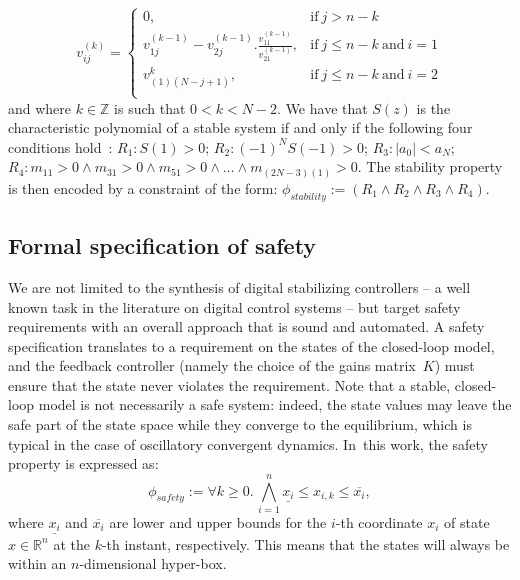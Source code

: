 \documentclass[twocolumn]{autart}    %
\newcommand{\addtodo}[1]{\textcolor{red}{[#1]}}
\begin{document}
%
$$
v_{ij}^{(k)}=\left\{
\begin{array}{ll}
0,&\mbox{if}~j>n-k\\
v_{1j}^{(k-1)}-v_{2j}^{(k-1)} . \frac{v_{11}^{(k-1)}}{v_{21}^{(k-1)}}, & \mbox{if}~j\leq n-k ~\mbox{and}~i=1\\
v_{(1)(N-j+1)}^{k},& \mbox{if}~j\leq n-k ~\mbox{and}~i=2\\
\end{array}
\right.
$$
%
and where $k \in \mathbb{Z}$ is such that $0 < k < N - 2$. 
We have that $S(z)$ is the characteristic polynomial of a stable system if and only if the following four conditions hold~\cite{astrom1997computer}:
$R_1: S(1) > 0$;
$R_2: (−1)^N S(−1) > 0$;
$R_3: |a_0| < a_N$;
$R_4: m_{11} > 0 \wedge\allowbreak
      m_{31}>0 \wedge\allowbreak
      m_{51}>0 \wedge \ldots \wedge\allowbreak
      m_{(2N{-}3)(1)}>0$.
%
The stability property is then encoded by a constraint of the form:
$
\phi_\mathit{stability} := (R_1 \wedge R_2 \wedge R_3 \wedge R_4).
$


\subsection{Formal specification of safety} 
\label{ssec:safespecification}

We are not limited to the synthesis of digital stabilizing controllers -- a
well known task in the literature on digital control systems -- but target
safety requirements with an overall approach that is sound and automated. 
A safety specification translates to a requirement on the states of the closed-loop model, 
and the feedback controller (namely the choice of the gains matrix~$K$) 
must ensure that the state never violates the requirement.  
Note that a stable, closed-loop model is not necessarily a safe system: 
indeed, the state values may leave the safe part of the state space while they converge
to the equilibrium, which is typical in the case of oscillatory convergent dynamics. 
In~this work, the safety property is expressed as:
%
\begin{equation}
\label{eq:safetyliteral}
\phi_\mathit{safety} := \forall k\ge 0.\, \bigwedge_{i=1}^{n}{\underline{x_{i}} \leq x_{i,k} \leq \overline{x_{i}}},
\end{equation}
%
%
where $\underline{x_{i}}$ and $\overline{x_{i}}$ are lower and upper bounds
for the $i$-th coordinate $x_{i}$ of state $x\in \mathbb R^n$ at the $k$-th
instant, respectively.  This means that the states will always be within an $n$-dimensional hyper-box.
\end{document}
